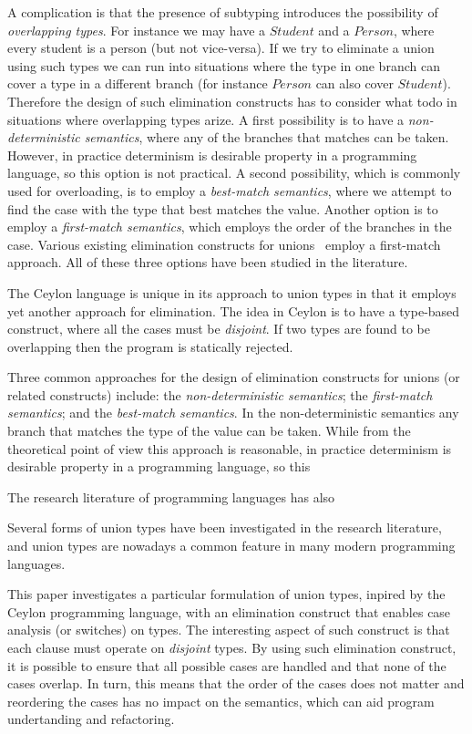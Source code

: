 A complication is that the presence of subtyping introduces the
possibility of \emph{overlapping types}. For instance we may have a
$Student$ and a $Person$, where every student is a person (but not
vice-versa). If we try to eliminate a union using such types we can
run into situations where the type in one branch can cover a type in a
different branch (for instance $Person$ can also cover
$Student$). Therefore the design of such elimination constructs has to
consider what todo in situations where overlapping types arize.  A
first possibility is to have a \emph{non-deterministic semantics},
where any of the branches that matches can be taken. However, in
practice determinism is desirable property in a programming language,
so this option is not practical. A second possibility, which is
commonly used for overloading, is to employ a \emph{best-match
  semantics}, where we attempt to find the case with the type that
best matches the value. Another option is to employ a
\emph{first-match semantics}, which employs the order of the branches
in the case. Various existing elimination constructs for unions~\cite{}
employ a first-match approach. All of these three options have been studied
in the literature. 

The Ceylon language is unique in its approach to union types in that it
employs yet another approach for elimination. The idea in Ceylon is to have
a type-based construct, where all the cases must be \emph{disjoint}. If two
types are found to be overlapping then the program is statically rejected.


Three common approaches for the design of elimination constructs for unions
(or related constructs) include: the \emph{non-deterministic semantics};
the \emph{first-match semantics}; and the \emph{best-match semantics}.
In the non-deterministic semantics any branch that matches the type
of the value can be taken. While from the theoretical point of view this
approach is reasonable, in practice determinism is desirable property in a
programming language, so this 


The research literature of programming languages has also 

Several forms of
union types have been investigated in the research literature, and
union types are nowadays a common feature in many modern programming
languages.

This paper investigates a particular formulation of union types,
inpired by the Ceylon programming language, with an elimination
construct that enables case analysis (or switches) on types.  The
interesting aspect of such construct is that each clause must operate
on \emph{disjoint} types. By using such elimination construct, it is
possible to ensure that all possible cases are
handled and that none of the cases overlap. In turn, this means that
the order of the cases does not matter and reordering the cases has no
impact on the semantics, which can aid program undertanding and
refactoring.

